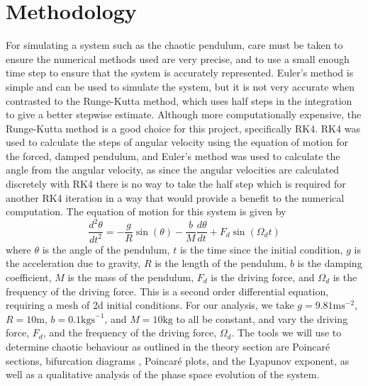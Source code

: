 \documentclass[11pt]{article} %
\begin{document}
\section{Methodology}
    For simulating a system such as the chaotic pendulum, care must be taken to ensure the numerical methods 
    used are very precise, and to use a small enough time step to ensure that the system is accurately represented.
    Euler's method is simple and can be used to simulate the system, but it is not very accurate when contrasted to
    the Runge-Kutta method, which uses half steps in the integration to give a better stepwise estimate. Although 
    more computationally expensive, the Runge-Kutta method is a good choice for this project, specifically
    RK4\cite{Strogatz2000}. RK4 was used to calculate the steps of angular velocity using the equation of
    motion for the forced, damped pendulum, and Euler's method was used to calculate the angle from the angular velocity, 
    as since the angular velocities are calculated discretely with RK4 there is no way to take the half step which is required 
    for another RK4 iteration in a way that would provide a benefit to the numerical computation. The equation of motion
    for this system\cite{PhysRevE.53.1579} is given by
    \begin{equation}
        \frac{d^2\theta}{dt^2} = -\frac{g}{R}\sin(\theta) - \frac{b}{M}\frac{d\theta}{dt} + F_d\sin(\Omega_d t)
    \end{equation}
    where $\theta$ is the angle of the pendulum, $t$ is the time since the initial condition, $g$ is the acceleration due to gravity,
    $R$ is the length of the pendulum, $b$ is the damping coefficient, $M$ is the mass of the pendulum, $F_d$ is the driving force,
    and $\Omega_d$ is the frequency of the driving force. This is a second order differential equation, requiring a mesh of 2d initial
    conditions. For our analysis, we take $g=9.81\text{ms}^{-2}$, $R=10\text{m}$, $b=0.1\text{kgs}^{-1}$, and $M=10\text{kg}$ to all 
    be constant, and vary the driving force, $F_d$, and the frequency of the driving force, $\Omega_d$. The tools we will use to determine
    chaotic behaviour as outlined in the theory section are Poincar\'e sections\cite{PoincareSection}, bifurcation diagrams \cite{Bifurcation}, 
    Poincar\'e plots\cite{kamen1996poincare}, and the Lyapunov exponent\cite{Lyapunov}, as well as a qualitative analysis of the phase space
     evolution of the system.\\
\end{document}
